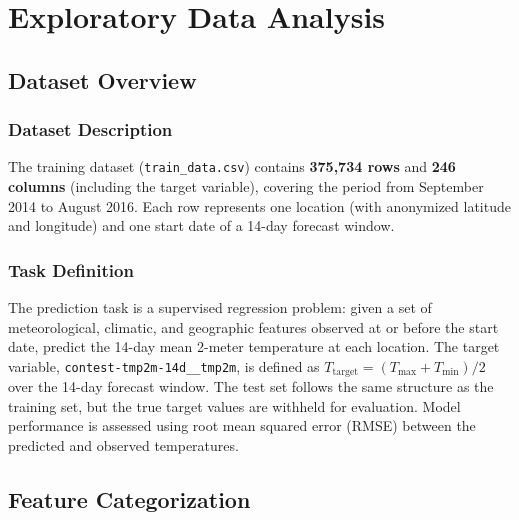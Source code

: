 \newpage
\section{Exploratory Data Analysis}
\thispagestyle{plain}
\vspace{0.5em}

\subsection{Dataset Overview}

\subsubsection{Dataset Description}

The training dataset (\texttt{train\_data.csv}) contains \textbf{375,734 rows} and \textbf{246 columns} (including the target variable), covering the period from September 2014 to August 2016. Each row represents one location (with anonymized latitude and longitude) and one start date of a 14-day forecast window.

\subsubsection{Task Definition}

The prediction task is a supervised regression problem: given a set of meteorological, climatic, and geographic features observed at or before the start date, predict the 14-day mean 2-meter temperature at each location. The target variable, \texttt{contest-tmp2m-14d\_\_tmp2m}, is defined as $T_{\text{target}} = (T_{\max} + T_{\min}) / 2$ over the 14-day forecast window. The test set follows the same structure as the training set, but the true target values are withheld for evaluation. Model performance is assessed using root mean squared error (RMSE) between the predicted and observed temperatures.

\subsection{Feature Categorization}

